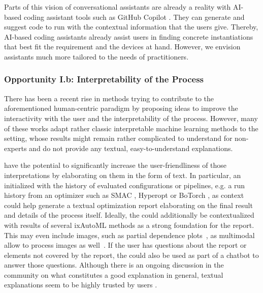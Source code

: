 Parts of this vision of conversational \AutoML assistants are already a reality with AI-based coding assistant tools such as GitHub Copilot \cite{copilot-github21a}. They can generate and suggest code to run \AutoML with the contextual information that the users give. Thereby, AI-based coding assistants already assist users in finding concrete \AutoML instantiations that best fit the requirement and the devices at hand. However, we envision assistants much more tailored to the needs of \ML practitioners. 

\subsubsection{Opportunity I.b: Interpretability of the \AutoML Process}
\label{llm-ssec:interpretability-of-results}

There has been a recent rise in methods trying to contribute to the aforementioned human-centric \AutoML paradigm \cite{pfisterer-arxiv2019a,lindauer-automlorg22,moosbauer-neurips21a,moosbauer-arxiv22a,segel-automl23a} by proposing ideas to improve the interactivity with the user and the interpretability of the \AutoML process. However, many of these works adapt rather classic interpretable machine learning methods to the \AutoML setting, whose results might remain rather complicated to understand for non-experts and do not provide any textual, easy-to-understand explanations. 

\LLMs have the potential to significantly increase the user-friendliness of those interpretations by elaborating on them in the form of text. In particular, an \LLM initialized with the history of evaluated configurations or pipelines, e.g. a run history from an optimizer such as SMAC \cite{lindauer-jmlr22a}, Hyperopt \cite{komer-automl14a} or BoTorch \cite{balandat-neurips20a}, as context could help generate a textual optimization report elaborating on the final \AutoML result and details of the process itself. Ideally, the \LLM could additionally be contextualized with results of several ixAutoML methods as a strong foundation for the report. This may even include images, such as partial dependence plots~\cite{moosbauer-neurips21a}, as multimodal \LLMs allow to process images as well~\cite{li-arxiv2023a, zhang-arxiv2023a}. If the user has questions about the report or elements not covered by the report, the \LLM could also be used as part of a chatbot to answer those questions. Although there is an ongoing discussion in the community on what constitutes a good explanation in general, textual explanations seem to be highly trusted by users \cite{gilpin-dsaa18a}.

